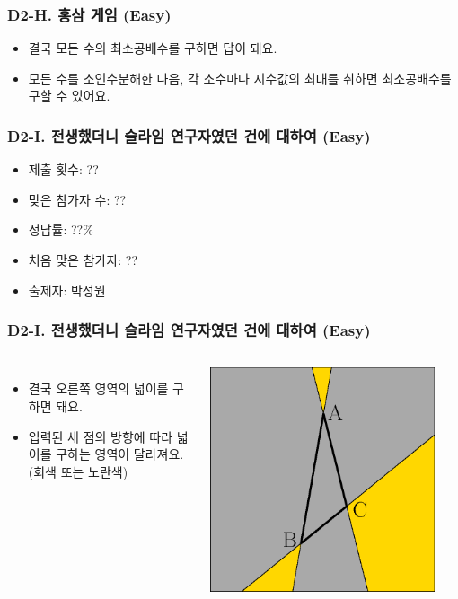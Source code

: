 \documentclass[xetex]{beamer}
\begin{document}
\begin{frame}
  \frametitle{D2-H. 홍삼 게임 (Easy)}
  \begin{itemize}
    \item 결국 모든 수의 최소공배수를 구하면 답이 돼요.
    \item 모든 수를 소인수분해한 다음, 각 소수마다 지수값의 최대를 취하면 최소공배수를 구할 수 있어요.
  \end{itemize}
\end{frame}

\begin{frame}
  \frametitle{D2-I. 전생했더니 슬라임 연구자였던 건에 대하여 (Easy)}
  \begin{itemize}
    \item 제출 횟수: ??
    \item 맞은 참가자 수: ??
    \item 정답률: ??\%
    \item 처음 맞은 참가자: ??
    \item 출제자: 박성원
  \end{itemize}
\end{frame}

\begin{frame}
  \frametitle{D2-I. 전생했더니 슬라임 연구자였던 건에 대하여 (Easy)}
  \begin{columns}
      \begin{itemize}
        \item 결국 오른쪽 영역의 넓이를 구하면 돼요.
        \item 입력된 세 점의 방향에 따라 넓이를 구하는 영역이 달라져요. (회색 또는 노란색)
      \end{itemize}
      \includegraphics[width=0.9\textwidth]{torres-solution.eps}
  \end{columns}
\end{frame}
\end{document}
